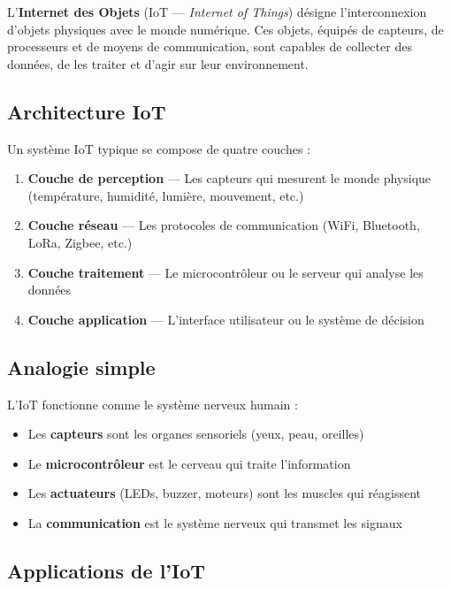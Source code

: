\documentclass[12pt, a4paper]{article}
\begin{document}
L'\textbf{Internet des Objets} (IoT — \textit{Internet of Things}) désigne l'interconnexion d'objets physiques avec le monde numérique. Ces objets, équipés de capteurs, de processeurs et de moyens de communication, sont capables de collecter des données, de les traiter et d'agir sur leur environnement.

\subsection{Architecture IoT}

Un système IoT typique se compose de quatre couches :

\begin{enumerate}
    \item \textbf{Couche de perception} — Les capteurs qui mesurent le monde physique (température, humidité, lumière, mouvement, etc.)
    \item \textbf{Couche réseau} — Les protocoles de communication (WiFi, Bluetooth, LoRa, Zigbee, etc.)
    \item \textbf{Couche traitement} — Le microcontrôleur ou le serveur qui analyse les données
    \item \textbf{Couche application} — L'interface utilisateur ou le système de décision
\end{enumerate}

\subsection{Analogie simple}

L'IoT fonctionne comme le système nerveux humain :
\begin{itemize}
    \item Les \textbf{capteurs} sont les organes sensoriels (yeux, peau, oreilles)
    \item Le \textbf{microcontrôleur} est le cerveau qui traite l'information
    \item Les \textbf{actuateurs} (LEDs, buzzer, moteurs) sont les muscles qui réagissent
    \item La \textbf{communication} est le système nerveux qui transmet les signaux
\end{itemize}

\subsection{Applications de l'IoT}
\end{document}
